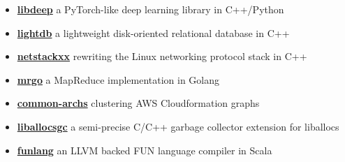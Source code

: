 \documentclass[11pt,a4paper]{article}
\begin{document}
    \begin{itemize}[leftmargin=0em]
        \item [] \href{https://github.com/muffpy/libdeep}{\textbf{libdeep}} a PyTorch-like deep learning library in C++/Python
        \item [] \href{https://github.com/muffpy/lightdb}{\textbf{lightdb}} a lightweight disk-oriented relational database in C++
        \item [] \href{https://github.com/muffpy/netstackxx}{\textbf{netstackxx}} rewriting the Linux networking protocol stack in C++
        \item [] \href{https://github.com/muffpy/mrgo}{\textbf{mrgo}} a MapReduce implementation in Golang
        \item  [] \href{https://muffpy.github.io/assets/home/commonarch_press.pdf}{\textbf{common-archs}} clustering AWS Cloudformation graphs
        \item [] \href{https://github.com/muffpy/liballocsgc}{\textbf{liballocsgc}} a semi-precise C/C++ garbage collector extension for liballocs
        \item [] \href{https://github.com/muffpy/funlang}{\textbf{funlang}} an LLVM backed FUN language compiler in Scala
    \end{itemize}
\end{document}
